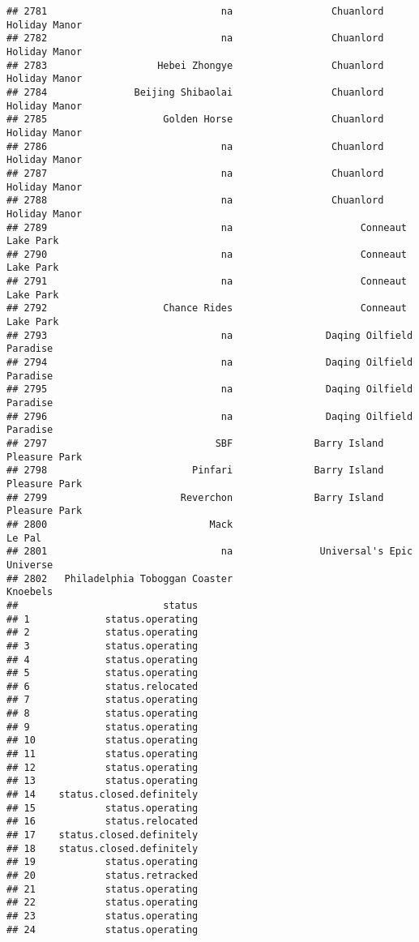 \documentclass[
]{article}
\begin{document}
\begin{verbatim}
## 2781                              na                 Chuanlord Holiday Manor
## 2782                              na                 Chuanlord Holiday Manor
## 2783                   Hebei Zhongye                 Chuanlord Holiday Manor
## 2784               Beijing Shibaolai                 Chuanlord Holiday Manor
## 2785                    Golden Horse                 Chuanlord Holiday Manor
## 2786                              na                 Chuanlord Holiday Manor
## 2787                              na                 Chuanlord Holiday Manor
## 2788                              na                 Chuanlord Holiday Manor
## 2789                              na                      Conneaut Lake Park
## 2790                              na                      Conneaut Lake Park
## 2791                              na                      Conneaut Lake Park
## 2792                    Chance Rides                      Conneaut Lake Park
## 2793                              na                Daqing Oilfield Paradise
## 2794                              na                Daqing Oilfield Paradise
## 2795                              na                Daqing Oilfield Paradise
## 2796                              na                Daqing Oilfield Paradise
## 2797                             SBF              Barry Island Pleasure Park
## 2798                         Pinfari              Barry Island Pleasure Park
## 2799                       Reverchon              Barry Island Pleasure Park
## 2800                            Mack                                  Le Pal
## 2801                              na               Universal's Epic Universe
## 2802   Philadelphia Toboggan Coaster                                Knoebels
##                         status
## 1             status.operating
## 2             status.operating
## 3             status.operating
## 4             status.operating
## 5             status.operating
## 6             status.relocated
## 7             status.operating
## 8             status.operating
## 9             status.operating
## 10            status.operating
## 11            status.operating
## 12            status.operating
## 13            status.operating
## 14    status.closed.definitely
## 15            status.operating
## 16            status.relocated
## 17    status.closed.definitely
## 18    status.closed.definitely
## 19            status.operating
## 20            status.retracked
## 21            status.operating
## 22            status.operating
## 23            status.operating
## 24            status.operating

\end{verbatim}
\end{document}
